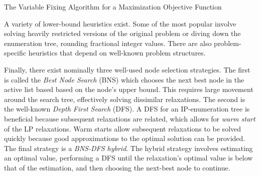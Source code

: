 \begin{algorithm}[H]
 \SetAlgoLined
 \caption{The Variable Fixing Algorithm for a Maximization Objective Function}
\end{algorithm}

A variety of lower-bound heuristics exist. Some of the most popular involve
solving heavily restricted versions of the original problem or diving down the
enumeration tree, rounding fractional integer values. There are also
problem-specific heuristics that depend on well-known problem structures.

Finally, there exist nominally three well-used node selection strategies. The
first is called the \textit{Best Node Search} (BNS) which chooses the next best
node in the active list based based on the node's upper bound. This requires
large movement around the search tree, effectively solving dissimilar
relaxations. The second is the well-known \textit{Depth First Search} (DFS). A
DFS for an IP-enumeration tree is beneficial because subsequent relaxations are
related, which allows for \textit{warm start} of the LP relaxations. Warm starts
allow subsequent relaxations to be solved quickly because good approximations to
the optimal solution can be provided. The final strategy is a \textit{BNS-DFS
hybrid}. The hybrid strategy involves estimating an optimal value, performing a
DFS until the relaxation's optimal value is below that of the estimation, and
then choosing the next-best node to continue.
